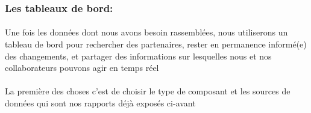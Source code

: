 \documentclass[a4paper, 12pt]{report}
\begin{document}
\begin{itemize}
\subsubsection{Les tableaux de bord:}
\paragraph{}
Une fois les données dont nous avons besoin rassemblées, nous utiliserons un tableau de bord pour rechercher des partenaires, rester en permanence informé(e) des changements, et partager des informations sur lesquelles nous et nos collaborateurs pouvons agir en temps réel
\paragraph{}
La première des choses c'est de choisir le type de composant et les sources de données qui sont nos rapports déjà exposés ci-avant


\end{itemize}
\end{document}

